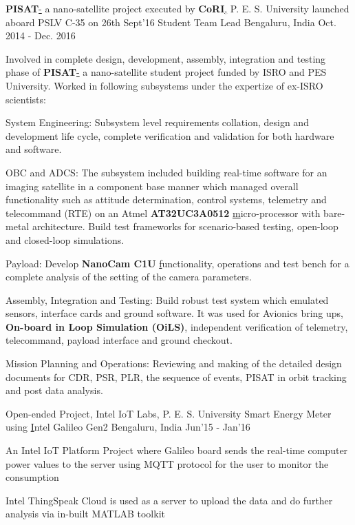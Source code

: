 
\begin{cventries}
	\cventry
	{\textbf{PISAT}\href{http://pisat.pes.edu/}- a nano-satellite project executed by \textbf{CoRI}\href{http://cori.pes.edu/}, P. E. S. University launched aboard PSLV C-35 on 26th Sept'16}
	{Student Team Lead}
	{Bengaluru, India}
	{Oct. 2014 - Dec. 2016}
	{
		\begin{cvitems}
		\item{Involved in complete design, development, assembly, integration and testing phase of \textbf{PISAT}\href{https://www.isro.gov.in/Spacecraft/pisat} - a nano-satellite student project funded by ISRO and PES University. Worked in following subsystems under the expertize of ex-ISRO scientists:}
		\item{System Engineering: Subsystem level requirements collation, design and development life cycle, complete verification and validation for both hardware and software.}
		\item{OBC and ADCS: The subsystem included building real-time software for an imaging satellite in a component base manner which managed overall functionality such as attitude determination, control systems, telemetry and telecommand (RTE) on an Atmel \textbf{AT32UC3A0512 }\href{https://www.microchip.com/wwwproducts/en/AT32UC3A0512} micro-processor with bare-metal architecture. Build test frameworks for scenario-based testing, open-loop and closed-loop simulations.}
		\item{Payload: Develop \textbf{NanoCam C1U }\href{https://gomspace.com/UserFiles/Subsystems/datasheet/gs-ds-nanocam-c1u-17.pdf} functionality, operations and test bench for a complete analysis of the setting of the camera parameters.}
		\item{Assembly, Integration and Testing: Build robust test system which emulated sensors, interface cards and ground software. It was used for Avionics bring ups, \textbf{On-board in Loop Simulation (OiLS)}, independent verification of telemetry, telecommand, payload interface and ground checkout.}
		\item{Mission Planning and Operations: Reviewing and making of the detailed design documents for CDR, PSR, PLR, the sequence of events, PISAT in orbit tracking and post data analysis.}
		\end{cvitems}
	}
\end{cventries}
\begin{cventries}
	\cventry
	{Open-ended Project, Intel IoT Labs, P. E. S. University}
	{Smart Energy Meter using \href{https://www.arduino.cc/en/ArduinoCertified/IntelGalileoGen2}Intel Galileo Gen2}
	{Bengaluru, India}
	{Jun'15 - Jan'16}
	{
		\begin{cvitems}
		\item{An Intel IoT Platform Project where Galileo board sends the real-time computer power values to the server using MQTT protocol for the user to monitor the consumption}
		\item{Intel ThingSpeak Cloud is used as a server to upload the data and do further analysis via in-built MATLAB toolkit}
		\end{cvitems}
	}
\end{cventries}
